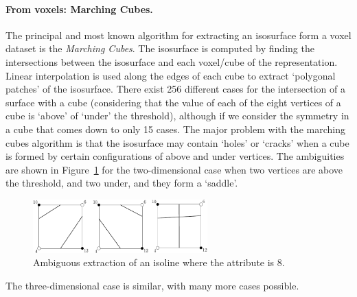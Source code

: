 \paragraph{From voxels: Marching Cubes.} 
The principal and most known algorithm for extracting an isosurface form a voxel dataset is the \emph{Marching Cu\-bes}. 
The isosurface is computed by finding the intersections between the isosurface and each voxel/cube of the representation. 
Linear interpolation is used along the edges of each cube to extract `polygonal patches' of the isosurface. 
There exist 256 different cases for the intersection of a surface with a cube (considering that the value of each of the eight vertices of a cube is `above' of `under' the threshold), although if we consider the symmetry in a cube that comes down to only 15 cases. 
The major problem with the marching cubes algorithm is that the isosurface may contain `holes' or `cracks' when a cube is formed by certain configurations of above and under vertices. 
The ambiguities are shown in Figure~\ref{fig:isosurface_ambiguity} for the two-dimensional case when two vertices are above the threshold, and two under, and they form a `saddle'.
\begin{figure}
  \centering
  \includegraphics[width=0.6\textwidth]{figs/isosurface_ambiguity}
  \caption{Ambiguous extraction of an isoline where the attribute is 8.}%
\label{fig:isosurface_ambiguity}
\end{figure}
The three-dimensional case is similar, with many more cases possible. 

%

